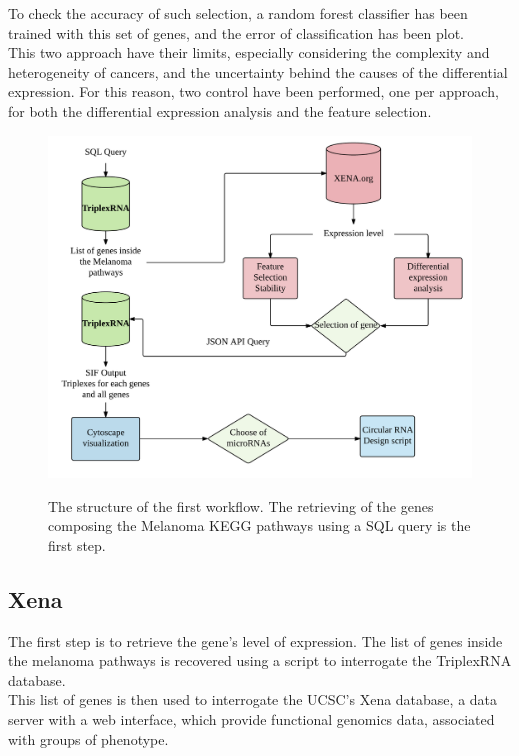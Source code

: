 \documentclass[a4paper,12pt]{report}
\begin{document}
To check the accuracy of such selection, a random forest classifier \cite{springer} has been trained with this set of genes, and the error of classification has been plot.\\

This two approach have their limits, especially considering the complexity and heterogeneity of cancers\cite{TGCA, complexity}, and the uncertainty behind the causes of the differential expression. For this reason, two control have been performed, one per approach, for both the differential expression analysis and the feature selection.


\begin{figure}[H]
	\centering
	{\includegraphics[width=1\textwidth]{Workflow1.png}}
	\caption{The structure of the first workflow. The retrieving of the genes composing the Melanoma KEGG pathways using a SQL query is the first step.}
\end{figure}

\subsection{Xena}

The first step is to retrieve the gene's level of expression. The list of genes inside the melanoma pathways is recovered using a script to interrogate the TriplexRNA database.\\

This list of genes is then used to interrogate the UCSC's Xena database\cite{Xena}, a data server with a web interface, which provide functional genomics data, associated with groups of phenotype.\\
\end{document}
